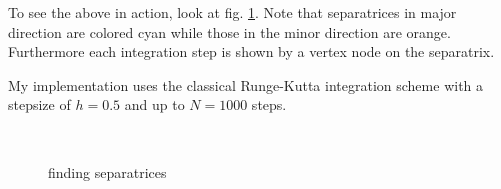 \documentclass[a4paper,10pt,notitlepage]{scrreprt}
\begin{document}
To see the above in action, look at fig. \ref{fig:separatrices}. Note that
separatrices in major direction are colored cyan while those in the minor
direction are orange. Furthermore each integration step is shown by a vertex
node on the separatrix.

My implementation uses the classical Runge-Kutta integration scheme with a
stepsize of $h = 0.5$ and up to $N = 1000$ steps.

\begin{figure}
  \centering
  \\
  \caption{finding separatrices}
  \label{fig:separatrices}
\end{figure}
\end{document}
